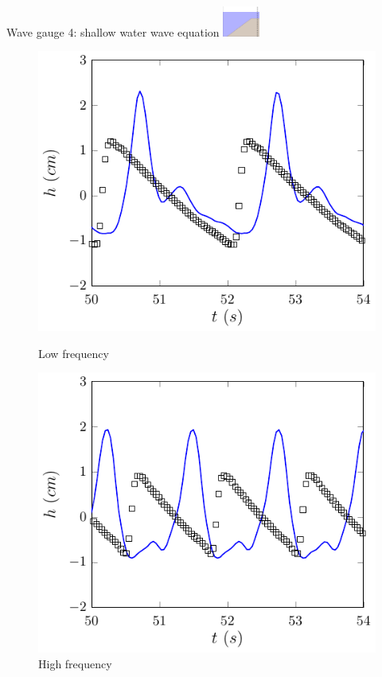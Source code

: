 \documentclass[pdf]{beamer}
\begin{document}
\begin{frame}{Wave gauge 4: shallow water wave equation \space\space	\includegraphics[width=1.2cm]{./Pics/WT4z.pdf}  }
	\begin{figure}
		\centering
		\begin{minipage}{.5\textwidth}
			\centering
			\includegraphics[width=0.9\linewidth]{./Pics/SL/WG4/1SWW-figure0.pdf}
			\caption{Low frequency}
		\end{minipage}%
		\begin{minipage}{.5\textwidth}
			\centering
			\includegraphics[width=0.9\linewidth]{./Pics/SH/WG4/1SWW-figure0.pdf}
			\caption{High frequency}
		\end{minipage}
	\end{figure}
\end{frame}
\end{document}
